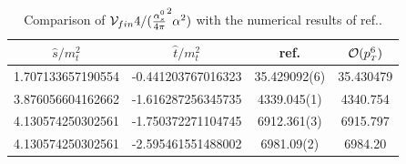\begin{table}
	\renewcommand{\arraystretch}{1.2}
	\centering
	\begin{tabular}{| c| c | c | c| } \hline
		\rowcolor{lightgray}  $\hat{s}/m_t^2$ & $\hat{t}/m_t^2$ &  ref.\cite{Chen:2020gae} & $\mathcal{O}(p_{\scriptscriptstyle T}^6)$  \\ \hline 
		\cellcolor{lightgray} 1.707133657190554 & \cellcolor{lightgray} -0.441203767016323 & 35.429092(6) & 35.430479 \\
		\cellcolor{lightgray} 3.876056604162662 & \cellcolor{lightgray} -1.616287256345735 & 4339.045(1) & 4340.754 \\
		\cellcolor{lightgray} 4.130574250302561 & \cellcolor{lightgray} -1.750372271104745 & 6912.361(3) & 6915.797 \\
		\cellcolor{lightgray} 4.130574250302561 & \cellcolor{lightgray} -2.595461551488002 & 6981.09(2) & 6984.20  \\ \hline
	\end{tabular}
	\caption{Comparison of $\mathcal{V}_{fin} 4/(\frac{\alpha_s^0}{4 \pi}^2 \alpha^2)$ with the numerical results of ref.\cite{Chen:2020gae}. \label{tab:comparison}}
\end{table}

